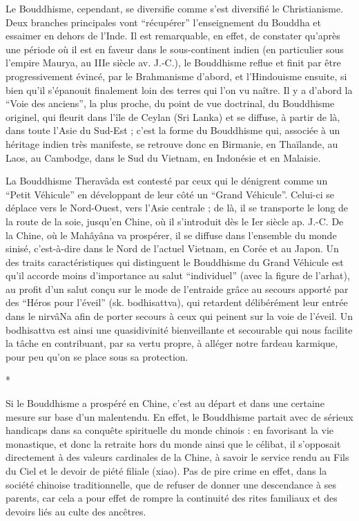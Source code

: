\documentclass[11pt,a4paper]{article} %
\begin{document}
Le Bouddhisme, cependant, se diversifie comme s'est diversifié le Christianisme.
Deux
branches principales vont ``récupérer'' l'enseignement du Bouddha et essaimer en dehors de l'Inde.
Il est remarquable, en effet, de constater qu'après une période où il est en
faveur dans le sous-continent indien (en particulier sous l'empire Maurya, au IIIe siècle
av. J.-C.), le Bouddhisme reflue et finit par être progressivement évincé, par le Brahmanisme d'abord, et l'Hindouisme ensuite, si bien qu'il s'épanouit finalement loin des
terres qui l'on vu naître.
Il y a d'abord la ``Voie des anciens'', la plus
proche, du point de vue doctrinal, du Bouddhisme originel, qui fleurit dans l'île de
Ceylan (Sri Lanka) et se diffuse, à partir de là, dans toute l'Asie du Sud-Est ; c'est la
forme du Bouddhisme qui, associée à un héritage indien très manifeste, se retrouve donc
en Birmanie, en Thaïlande, au Laos, au Cambodge, dans le Sud du Vietnam, en Indonésie et en Malaisie.

La Bouddhisme Theravâda est contesté par ceux qui le dénigrent comme un ``Petit Véhicule'' en développant de leur côté un ``Grand Véhicule''.
Celui-ci se déplace vers le Nord-Ouest, vers l'Asie centrale ; de là, il se transporte le
long de la route de la soie, jusqu'en Chine, où il s'introduit dès le Ier siècle ap. J.-C.
De
la Chine, où le Mahâyâna va prospérer, il se diffuse dans l'ensemble du monde sinisé,
c'est-à-dire dans le Nord de l'actuel Vietnam, en Corée et au Japon.
Un des traits caractéristiques qui distinguent le Bouddhisme du Grand Véhicule est qu'il accorde moins
d'importance au salut ``individuel'' (avec la figure de l'arhat), au profit d'un salut
conçu sur le mode de l'entraide grâce au secours apporté par des ``Héros pour l'éveil''
(sk. bodhisattva), qui retardent délibérément leur entrée dans le nirvâNa afin de porter
secours à ceux qui peinent sur la voie de l'éveil.
Un bodhisattva est ainsi une quasidivinité bienveillante et secourable qui nous facilite la tâche en contribuant, par sa vertu
propre, à alléger notre fardeau karmique, pour peu qu'on se place sous sa protection.
\begin{center}*\end{center}
Si le Bouddhisme a prospéré en Chine, c'est au départ et dans une certaine mesure sur
base d'un malentendu.
En effet, le Bouddhisme partait avec de sérieux handicaps dans
sa conquête spirituelle du monde chinois : en favorisant la vie monastique, et donc la
retraite hors du monde ainsi que le célibat, il s'opposait directement à des valeurs cardinales de la Chine, à savoir le service rendu au Fils du Ciel et le devoir de piété filiale
(xiao).
Pas de pire crime en effet, dans la société chinoise traditionnelle, que de refuser
de donner une descendance à ses parents, car cela a pour effet de rompre la continuité
des rites familiaux et des devoirs liés au culte des ancêtres.
\end{document}
